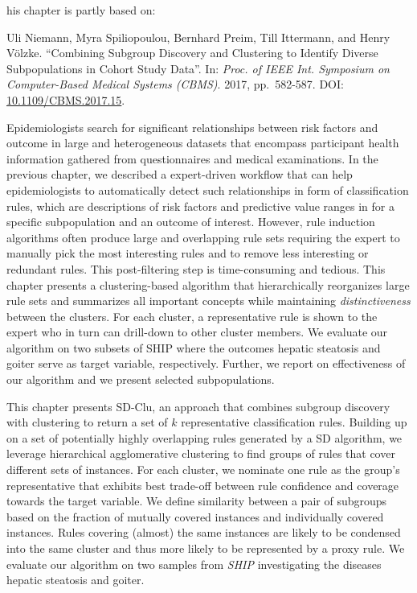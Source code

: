 \documentclass[
  oneside]{book}
\newenvironment{infobox}[1]
  {
  \begin{chapter-summary}
  }
  {
  \end{chapter-summary}
  }
\begin{document}
\begin{infobox}

This chapter is partly based on:

Uli Niemann, Myra Spiliopoulou, Bernhard Preim, Till Ittermann, and
Henry Völzke. ``Combining Subgroup Discovery and Clustering to Identify
Diverse Subpopulations in Cohort Study Data''. In: \emph{Proc. of IEEE Int.
Symposium on Computer-Based Medical Systems (CBMS)}. 2017, pp.~582-587.
DOI: \href{https://doi.org/10.1109\%2FCBMS.2017.15}{10.1109/CBMS.2017.15}.

\end{infobox}

Epidemiologists search for significant relationships between risk factors and outcome in large and heterogeneous datasets that encompass participant health information gathered from questionnaires and medical examinations.
In the previous chapter, we described a expert-driven workflow that can help epidemiologists to automatically detect such relationships in form of classification rules, which are descriptions of risk factors and predictive value ranges in for a specific subpopulation and an outcome of interest.
However, rule induction algorithms often produce large and overlapping rule sets requiring the expert to manually pick the most interesting rules and to remove less interesting or redundant rules.
This post-filtering step is time-consuming and tedious.
This chapter presents a clustering-based algorithm that hierarchically reorganizes large rule sets and summarizes all important concepts while maintaining \emph{distinctiveness} between the clusters.
For each cluster, a representative rule is shown to the expert who in turn can drill-down to other cluster members.
We evaluate our algorithm on two subsets of SHIP where the outcomes hepatic steatosis and goiter serve as target variable, respectively.
Further, we report on effectiveness of our algorithm and we present selected subpopulations.

This chapter presents SD-Clu, an approach that combines subgroup discovery with clustering to return a set of \(k\) representative classification rules.
Building up on a set of potentially highly overlapping rules generated by a SD algorithm, we leverage hierarchical agglomerative clustering to find groups of rules that cover different sets of instances.
For each cluster, we nominate one rule as the group's representative that exhibits best trade-off between rule confidence and coverage towards the target variable.
We define similarity between a pair of subgroups based on the fraction of mutually covered instances and individually covered instances.
Rules covering (almost) the same instances are likely to be condensed into the same cluster and thus more likely to be represented by a proxy rule.
We evaluate our algorithm on two samples from \emph{SHIP} investigating the diseases hepatic steatosis and goiter.
\end{document}
